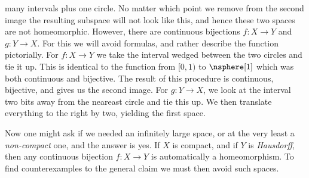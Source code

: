 \documentclass{book}                                                           %
\begin{document}
                many intervals plus one circle. No matter which point we remove
                from the second image the resulting subspace will not look like
                this, and hence these two spaces are not homeomorphic. However,
                there are continuous bijections $f:X\rightarrow{Y}$ and
                $g:Y\rightarrow{X}$. For this we will avoid formulas, and rather
                describe the function pictorially. For $f:X\rightarrow{Y}$ we
                take the interval wedged between the two circles and tie it up.
                This is identical to the function from $[0,1)$ to $\nsphere[1]$
                which was both continuous and bijective. The result of this
                procedure is continuous, bijective, and gives us the second
                image. For $g:Y\rightarrow{X}$, we look at the interval two bits
                away from the neareast circle and tie this up. We then translate
                everything to the right by two, yielding the first space.
                \par\hfill\par
                Now one might ask if we needed an infinitely large space, or at
                the very least a \textit{non-compact} one, and the answer is
                yes. If $X$ is compact, and if $Y$ is \textit{Hausdorff}, then
                any continuous bijection $f:X\rightarrow{Y}$ is automatically a
                homeomorphism. To find counterexamples to the general claim we
                must then avoid such spaces.
\end{document}

